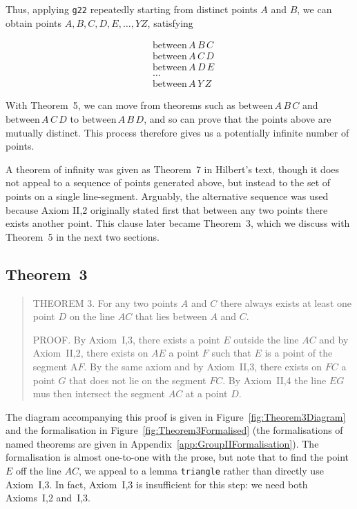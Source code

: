 \documentclass{article}
\newcommand{\between}[3]{\text{between}\,#1\,#2\,#3}
\begin{document}
Thus, applying \texttt{g22} repeatedly starting from distinct points $A$ and $B$, we can obtain points $A, B, C, D, E, \ldots, Y Z$, satisfying 

\begin{align*}
&\between{A}{B}{C}\\
&\between{A}{C}{D}\\
&\between{A}{D}{E}\\
&\ldots\\
&\between{A}{Y}{Z}
\end{align*}

With Theorem~5, we can move from theorems such as $\between{A}{B}{C}$ and $\between{A}{C}{D}$ to $\between{A}{B}{D}$, and so can prove that the points above are mutually distinct. This process therefore gives us a potentially infinite number of points.

A theorem of infinity was given as Theorem~7 in Hilbert's text, though it does not appeal to a sequence of points generated above, but instead to the set of points on a single line-segment. Arguably, the alternative sequence was used because Axiom II,2 originally stated first that between any two points there exists another point. This clause later became Theorem~3, which we discuss with Theorem~5 in the next two sections.

\subsection{Theorem~3}\label{sec:Theorem3}
\begin{quote}
  THEOREM 3. For any two points $A$ and $C$ there always exists at least one point $D$ on the line $AC$ that lies between $A$ and $C$.

  PROOF. By Axiom~I,3, there exists a point $E$ outside the line $AC$ and by Axiom~II,2, there exists on $AE$ a point $F$ such that $E$ is a point of the segment A$F$. By the same axiom and by Axiom~II,3, there exists on $FC$ a point $G$ that does not lie on the segment $FC$. By Axiom~II,4 the line $EG$ mus then intersect the segment $AC$ at a point $D$.
\end{quote}

The diagram accompanying this proof is given in Figure~\ref{fig:Theorem3Diagram} and the formalisation in Figure~\ref{fig:Theorem3Formalised} (the formalisations of named theorems are given in Appendix~\ref{app:GroupIIFormalisation}). The formalisation is almost one-to-one with the prose, but note that to find the point $E$ off the line $AC$, we appeal to a lemma \texttt{triangle} rather than directly use Axiom~I,3. In fact, Axiom~I,3 is insufficient for this step: we need both Axioms~I,2 and~I,3.
\end{document}
